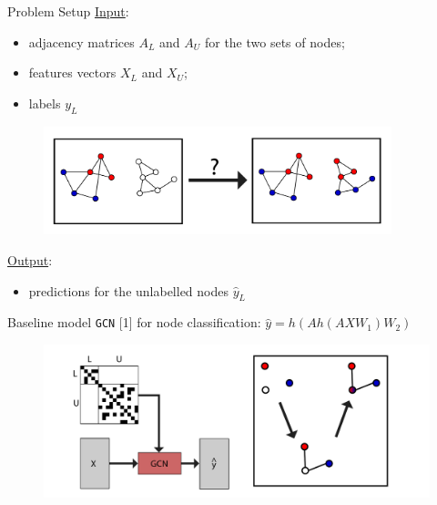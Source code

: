 \documentclass[final]{beamer}
\begin{document}
\begin{frame}[fragile]{}
\begin{textblock}{\colwidth}
\begin{paddedBlock}{Problem Setup}
\underline{Input}:
\begin{itemize}
\item adjacency matrices $A_L$ and $A_U$ for the two sets of nodes;
\item features vectors $X_L$ and $X_U$;
\item labels $y_L$
\end{itemize}
\begin{figure}
    \centering
    \includegraphics[width=0.90\textwidth]{img/graph_prob.pdf}
    \label{fig:coins}
\end{figure}
\underline{Output}:
\begin{itemize}
	\item predictions for the unlabelled nodes $\hat{y}_L$
\end{itemize}
\end{paddedBlock}

\begin{paddedBlock}{Baseline model}
\texttt{GCN} [1] for node classification: $\hat{y} = h(Ah(AXW_1)W_2)$
\begin{figure}
    \centering
    \includegraphics[width=.8\textwidth]{img/model_small.pdf}
    \label{fig:small}
\end{figure}
\end{paddedBlock}
\end{textblock}


\end{frame}
\end{document}
